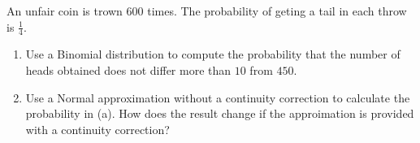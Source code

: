
\begin{exercise}

An unfair coin is trown $600$ times.
The probability of geting a tail in each throw is $\frac{1}{4}$.

\begin{enumerate}[label = (\alph*)]

    \item Use a Binomial distribution to compute the probability that the number of heads obtained does not differ more than $10$ from $450$.
    
    \item Use a Normal approximation without a continuity correction to calculate the probability in (a).
    How does the result change if the approimation is provided with a continuity correction?

\end{enumerate}

\end{exercise}


